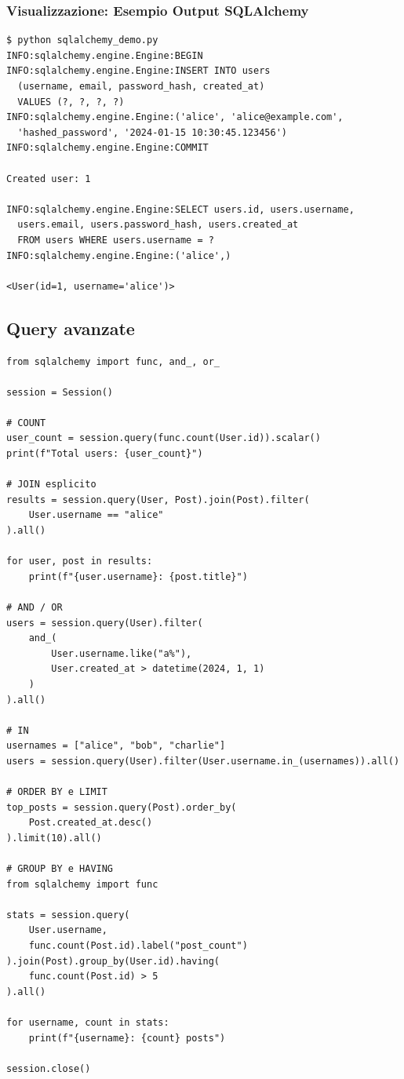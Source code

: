 \subsubsection{Visualizzazione: Esempio Output SQLAlchemy}

\begin{tcolorbox}[colback=black!5, colframe=black!75, title=SQLAlchemy ORM con echo=True, fonttitle=\bfseries\ttfamily]
\begin{verbatim}
$ python sqlalchemy_demo.py
INFO:sqlalchemy.engine.Engine:BEGIN
INFO:sqlalchemy.engine.Engine:INSERT INTO users
  (username, email, password_hash, created_at)
  VALUES (?, ?, ?, ?)
INFO:sqlalchemy.engine.Engine:('alice', 'alice@example.com',
  'hashed_password', '2024-01-15 10:30:45.123456')
INFO:sqlalchemy.engine.Engine:COMMIT

Created user: 1

INFO:sqlalchemy.engine.Engine:SELECT users.id, users.username,
  users.email, users.password_hash, users.created_at
  FROM users WHERE users.username = ?
INFO:sqlalchemy.engine.Engine:('alice',)

<User(id=1, username='alice')>
\end{verbatim}
\end{tcolorbox}

\subsection{Query avanzate}

\begin{lstlisting}
from sqlalchemy import func, and_, or_

session = Session()

# COUNT
user_count = session.query(func.count(User.id)).scalar()
print(f"Total users: {user_count}")

# JOIN esplicito
results = session.query(User, Post).join(Post).filter(
    User.username == "alice"
).all()

for user, post in results:
    print(f"{user.username}: {post.title}")

# AND / OR
users = session.query(User).filter(
    and_(
        User.username.like("a%"),
        User.created_at > datetime(2024, 1, 1)
    )
).all()

# IN
usernames = ["alice", "bob", "charlie"]
users = session.query(User).filter(User.username.in_(usernames)).all()

# ORDER BY e LIMIT
top_posts = session.query(Post).order_by(
    Post.created_at.desc()
).limit(10).all()

# GROUP BY e HAVING
from sqlalchemy import func

stats = session.query(
    User.username,
    func.count(Post.id).label("post_count")
).join(Post).group_by(User.id).having(
    func.count(Post.id) > 5
).all()

for username, count in stats:
    print(f"{username}: {count} posts")

session.close()
\end{lstlisting}

